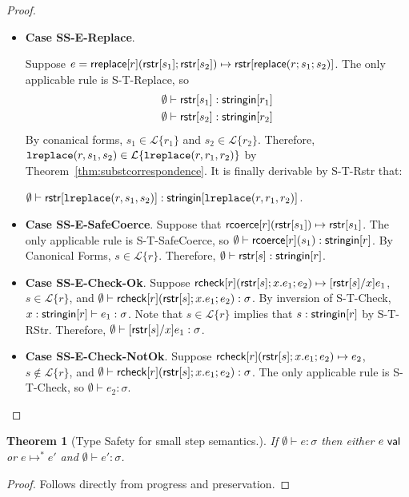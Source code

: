 \documentclass[11pt,leqno]{article}
\newtheorem{trthm}[tr]{Theorem}
\theoremstyle{definition}
\newcommand{\Lagr}{\mathcal{L}}
\newcommand{\lang}[1]{\Lagr\{#1\}}
\newcommand{\rcoerce}[2]{{\sf rcoerce}[#1](#2)}
\newcommand{\val}{{\sf val}}
\newcommand{\rcheck}[4]{ {\sf rcheck}[#1](#2;#3;#4) }
\newcommand{\stringin}[1]{{\sf stringin}[#1]}
\newcommand{\lsubst}[3]{{\sf replace}(#1;#2;#3)} %
\newcommand{\lreplace}[3]{{\sf lreplace}(#1; #2; #3)}
\renewcommand{\lreplace}[3]{{\tt lreplace}(#1, #2, #3)}
\begin{document}
\begin{proof}
\begin{itemize}[label=$ $,itemsep=1ex]
\item \textbf{Case SS-E-Replace}.

Suppose $e = \rreplace{r}{\rstr{s_1}}{\rstr{s_2}} \mapsto \rstr{\lsubst{r}{s_1}{s_2}}$.
The only applicable rule is 
S-T-Replace, so
\begin{align*}
\emptyset &\vdash \rstr{s_1} : \stringin{r_1} \\
\emptyset &\vdash \rstr{s_2} : \stringin{r_2}
\end{align*}
By conanical forms,
$s_1 \in \lang{r_1}$ and $s_2 \in \lang{r_2}$.
Therefore, $\lreplace{r}{s_1}{s_2} \in \lang{\lreplace{r}{r_1}{r_2}}$ by Theorem~\ref{thm:substcorrespondence}.
It is finally derivable by S-T-Rstr that:

$\emptyset \vdash \rstr{\lreplace{r}{s_1}{s_2}} : \stringin{\lreplace{r}{r_1}{r_2}}$.


\item \textbf{Case SS-E-SafeCoerce}.
Suppose that $\rcoerce{r}{\rstr{s_1}} \mapsto \rstr{s_1}$.
The only applicable rule is S-T-SafeCoerce, so 
$\emptyset\vdash \rcoerce{r}{s_1} : \stringin{r}$.
By Canonical Forms, $s \in \lang{r}$. Therefore, $\emptyset\vdash \rstr{s} : \stringin{r}$.

\item \textbf{Case SS-E-Check-Ok}.
Suppose $\rcheck{r}{\rstr{s}}{x.e_1}{e_2} \mapsto \subst{\rstr{s}}{x}{e_1}$,
$s \in \lang{r}$, and $\emptyset \vdash \rcheck{r}{\rstr{s}}{x.e_1}{e_2} : \sigma$.
By inversion of S-T-Check, $x : \stringin{r} \vdash e_1 : \sigma$.
Note that $s \in \lang{r}$ implies that $s : \stringin{r}$ by S-T-RStr.
Therefore, $\emptyset \vdash [{\sf rstr}[s]/x]e_1 : \sigma$.

\item \textbf{Case SS-E-Check-NotOk}.
Suppose $\rcheck{r}{\rstr{s}}{x.e_1}{e_2} \mapsto e_2$,
$s \not \in \lang{r}$, and $\emptyset \vdash \rcheck{r}{\rstr{s}}{x.e_1}{e_2} : \sigma$.
The only applicable rule is S-T-Check, so $\emptyset \vdash e_2 : \sigma$.

\end{itemize}
\end{proof}


\begin{trthm}[Type Safety for small step semantics.] \label{thm:sstypesafte}
If $\emptyset\vdash e : \sigma$ then either $e \ \val$ or $e \mapsto^* e'$ and $\emptyset\vdash e' : \sigma$.
\end{trthm}
\begin{proof}
Follows directly from progress and preservation.
\end{proof}
\end{document}

